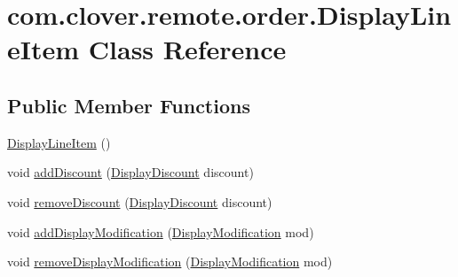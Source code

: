 \hypertarget{classcom_1_1clover_1_1remote_1_1order_1_1_display_line_item}{}\section{com.\+clover.\+remote.\+order.\+Display\+Line\+Item Class Reference}
\label{classcom_1_1clover_1_1remote_1_1order_1_1_display_line_item}
\subsection*{Public Member Functions}
\begin{DoxyCompactItemize}
\item 
\hyperlink{classcom_1_1clover_1_1remote_1_1order_1_1_display_line_item_a2b7961a782070ce3c45ce188f01ef946}{Display\+Line\+Item} ()
\item 
void \hyperlink{classcom_1_1clover_1_1remote_1_1order_1_1_display_line_item_a2d8a47761b8424d56cb94ac9a2aeb2af}{add\+Discount} (\hyperlink{classcom_1_1clover_1_1remote_1_1order_1_1_display_discount}{Display\+Discount} discount)
\item 
void \hyperlink{classcom_1_1clover_1_1remote_1_1order_1_1_display_line_item_a9c94a4841c4dfd5d761f6611c4bf9a19}{remove\+Discount} (\hyperlink{classcom_1_1clover_1_1remote_1_1order_1_1_display_discount}{Display\+Discount} discount)
\item 
void \hyperlink{classcom_1_1clover_1_1remote_1_1order_1_1_display_line_item_a296f5145db032266d5ffa871a525e82f}{add\+Display\+Modification} (\hyperlink{classcom_1_1clover_1_1remote_1_1order_1_1_display_modification}{Display\+Modification} mod)
\item 
void \hyperlink{classcom_1_1clover_1_1remote_1_1order_1_1_display_line_item_a86b9198436bf781235def3d95ecd0081}{remove\+Display\+Modification} (\hyperlink{classcom_1_1clover_1_1remote_1_1order_1_1_display_modification}{Display\+Modification} mod)
\end{DoxyCompactItemize}
